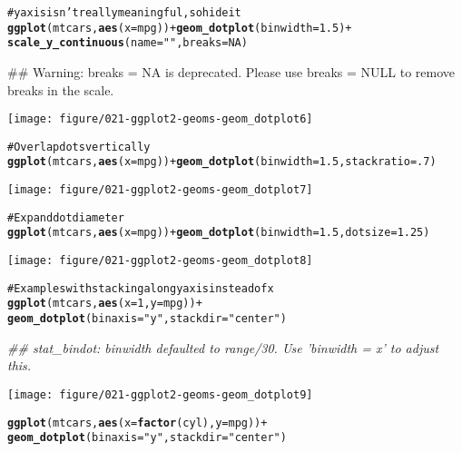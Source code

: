 \documentclass[a4paper,titlepage]{tufte-handout}\usepackage{graphicx, color}
\makeatletter
\def\maxwidth{ %
  \ifdim\Gin@nat@width>\linewidth
    \linewidth
  \else
    \Gin@nat@width
  \fi
}
\newcommand{\hlfunctioncall}[1]{\textcolor[rgb]{0.501960784313725,0,0.329411764705882}{\textbf{#1}}}%
\newcommand{\hlstring}[1]{\textcolor[rgb]{0.6,0.6,1}{#1}}%
\newcommand{\hlcomment}[1]{\textcolor[rgb]{0.180392156862745,0.6,0.341176470588235}{#1}}%
\newenvironment{kframe}{%
 \def\at@end@of@kframe{}%
 \ifinner\ifhmode%
  \def\at@end@of@kframe{\end{minipage}}%
  \begin{minipage}{\columnwidth}%
 \fi\fi%
 \def\FrameCommand##1{\hskip\@totalleftmargin \hskip-\fboxsep
 \colorbox{shadecolor}{##1}\hskip-\fboxsep
     \hskip-\linewidth \hskip-\@totalleftmargin \hskip\columnwidth}%
 \MakeFramed {\advance\hsize-\width
   \@totalleftmargin\z@ \linewidth\hsize
   \@setminipage}}%
 {\par\unskip\endMakeFramed%
 \at@end@of@kframe}
\newenvironment{knitrout}{}{} %
\makeatother
\begin{document}
\begin{knitrout}
\begin{kframe}
\begin{alltt}
\hlcomment{# y axis isn't really meaningful, so hide it}
\hlfunctioncall{ggplot}(mtcars, \hlfunctioncall{aes}(x = mpg)) + \hlfunctioncall{geom_dotplot}(binwidth = 1.5) +
  \hlfunctioncall{scale_y_continuous}(name = \hlstring{""}, breaks = NA)
\end{alltt}


{\ttfamily\noindent\textcolor{warningcolor}{\#\# Warning: breaks = NA is deprecated. Please use breaks = NULL to remove breaks in the scale.}}\end{kframe}
\texttt{[image: figure/021-ggplot2-geoms-geom\_dotplot6]} 
\begin{kframe}\begin{alltt}

\hlcomment{# Overlap dots vertically}
\hlfunctioncall{ggplot}(mtcars, \hlfunctioncall{aes}(x = mpg)) + \hlfunctioncall{geom_dotplot}(binwidth = 1.5, stackratio = .7)
\end{alltt}
\end{kframe}
\texttt{[image: figure/021-ggplot2-geoms-geom\_dotplot7]} 
\begin{kframe}\begin{alltt}

\hlcomment{# Expand dot diameter}
\hlfunctioncall{ggplot}(mtcars, \hlfunctioncall{aes}(x  =mpg)) + \hlfunctioncall{geom_dotplot}(binwidth = 1.5, dotsize = 1.25)
\end{alltt}
\end{kframe}
\texttt{[image: figure/021-ggplot2-geoms-geom\_dotplot8]} 
\begin{kframe}\begin{alltt}


\hlcomment{# Examples with stacking along y axis instead of x}
\hlfunctioncall{ggplot}(mtcars, \hlfunctioncall{aes}(x = 1, y = mpg)) +
  \hlfunctioncall{geom_dotplot}(binaxis = \hlstring{"y"}, stackdir = \hlstring{"center"})
\end{alltt}


{\ttfamily\noindent\itshape\textcolor{messagecolor}{\#\# stat\_bindot: binwidth defaulted to range/30. Use 'binwidth = x' to adjust this.}}\end{kframe}
\texttt{[image: figure/021-ggplot2-geoms-geom\_dotplot9]} 
\begin{kframe}\begin{alltt}

\hlfunctioncall{ggplot}(mtcars, \hlfunctioncall{aes}(x = \hlfunctioncall{factor}(cyl), y = mpg)) +
  \hlfunctioncall{geom_dotplot}(binaxis = \hlstring{"y"}, stackdir = \hlstring{"center"})
\end{alltt}



\end{kframe}
\end{knitrout}
\end{document}
